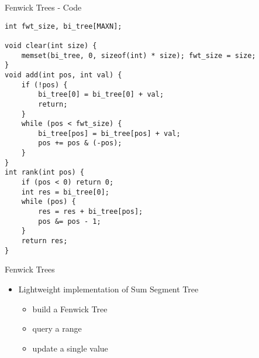 \documentclass[12pt,t]{beamer}
\newcommand{\bi}{\begin{itemize}}
\newcommand{\ei}{\end{itemize}}
\begin{document}
\begin{frame}[fragile]{Fenwick Trees - Code}
    \begin{verbatim}
int fwt_size, bi_tree[MAXN];

void clear(int size) {
    memset(bi_tree, 0, sizeof(int) * size); fwt_size = size;
}
void add(int pos, int val) {
    if (!pos) {
        bi_tree[0] = bi_tree[0] + val;
        return;
    }
    while (pos < fwt_size) {
        bi_tree[pos] = bi_tree[pos] + val;
        pos += pos & (-pos);
    }
}
int rank(int pos) {
    if (pos < 0) return 0;
    int res = bi_tree[0];
    while (pos) {
        res = res + bi_tree[pos];
        pos &= pos - 1;
    }
    return res;
}
    \end{verbatim}
\end{frame}

\begin{frame}{Fenwick Trees}
    \bi
        \item Lightweight implementation of Sum Segment Tree
        \bi
	  \item build a Fenwick Tree\onslide<2->{ in {\color{hilight}{$O(n)$}}}
	  \item query a range\onslide<3->{ in {\color{hilight}{$O(\log n)$}}}
	  \item update a single value\onslide<4->{ in {\color{hilight}{$O(\log n)$}}}
	\ei
    \ei
\end{frame}
\end{document}
